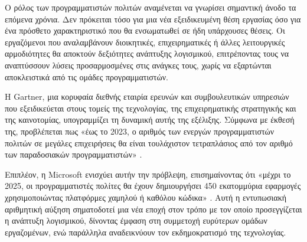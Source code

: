                 \begin{table}[H] \noindent\centering
                \end{table}

                Ο ρόλος των προγραμματιστών πολιτών αναμένεται να γνωρίσει σημαντική άνοδο τα επόμενα χρόνια. Δεν πρόκειται τόσο για μια νέα εξειδικευμένη θέση εργασίας όσο για ένα πρόσθετο χαρακτηριστικό που θα ενσωματωθεί σε ήδη υπάρχουσες θέσεις. Οι εργαζόμενοι που αναλαμβάνουν διοικητικές, επιχειρηματικές ή άλλες λειτουργικές αρμοδιότητες θα αποκτούν δεξιότητες ανάπτυξης λογισμικού, επιτρέποντας τους να αναπτύσσουν λύσεις προσαρμοσμένες στις ανάγκες τους, χωρίς να εξαρτώνται αποκλειστικά από τις ομάδες προγραμματιστών.

                Η Gartner, μια κορυφαία διεθνής εταιρία ερευνών και συμβουλευτικών υπηρεσιών που εξειδικεύεται στους τομείς της τεχνολογίας, της επιχειρηματικής στρατηγικής και της καινοτομίας, υπογραμμίζει τη δυναμική αυτής της εξέλιξης. Σύμφωνα με έκθεσή της, προβλέπεται πως «έως το 2023, ο αριθμός των ενεργών προγραμματιστών πολιτών σε μεγάλες επιχειρήσεις θα είναι τουλάχιστον τετραπλάσιος από τον αριθμό των παραδοσιακών προγραμματιστών» \cite{GartnerReport}.

                Επιπλέον, η Microsoft ενισχύει αυτήν την πρόβλεψη, επισημαίνοντας ότι «μέχρι το 2025, οι προγραμματιστές πολίτες θα έχουν δημιουργήσει 450 εκατομμύρια εφαρμογές χρησιμοποιώντας πλατφόρμες χαμηλού ή καθόλου κώδικα» \cite{cnbcNextFrontier}. Αυτή η εντυπωσιακή αριθμητική αύξηση σηματοδοτεί μια νέα εποχή στον τρόπο με τον οποίο προσεγγίζεται η ανάπτυξη λογισμικού, δίνοντας έμφαση στη συμμετοχή ευρύτερων ομάδων εργαζομένων, ενώ παράλληλα αναδεικνύουν τον εκδημοκρατισμό της τεχνολογίας.

